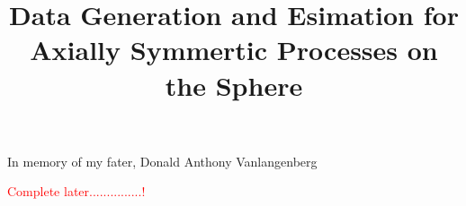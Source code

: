 \documentclass[phd]{uncgdissertation}
\title{Data Generation and Esimation for Axially Symmertic Processes on the Sphere }
\begin{document}

\frontmatter      %



\maketitlepage  

\makecopyrightpage


\begin{dedication}
In memory of my fater, Donald Anthony Vanlangenberg
\end{dedication}

\makeapprovalpage

\begin{acknowledgements}
\textcolor{red}{Complete later...............!}
\end{acknowledgements}

\end{document}
